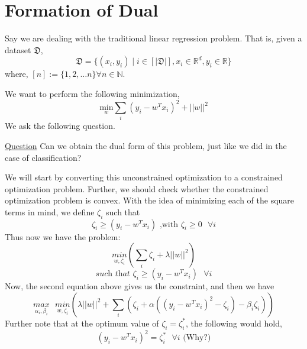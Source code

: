 \section{Formation of Dual}
Say we are dealing with the traditional linear regression problem. That is, given a dataset $\mathfrak{D}$,
\[\mathfrak{D} = \{(x_i,y_i) \mid i \in [|\mathfrak{D}|], x_i \in \mathbb{R}^d, y_i \in \mathbb{R}\}\]
where, $[n] := \{1,2, \dots n\} \forall n \in \mathbb{N}$.


We want to perform the following minimization,
\[\underset{{w}}{\text{min}}\sum_{i}(y_i - {w}^Tx_i)^2 + ||w||^2\]
We ask the following question.
\begin{center}
    \underline{Question} Can we obtain the dual form of this problem, just like we did in the case of classification?
\end{center}
We will start by converting this unconstrained optimization to a constrained optimization problem. Further, we should check whether the constrained optimization problem is convex.
With the idea of minimizing each of the square terms in mind, we define $\zeta_i$ such that
\[\zeta_i \geq (y_i - w^Tx_i) \text{ ,with } \zeta_i \geq 0 \text{ } \forall i\]
Thus now we have the problem:
\[\underset{w,\zeta_i}{min}(\sum_i\zeta_i + \lambda||w||^2)\]
\[\textit{such that } \zeta_i \geq (y_i - w^Tx_i) \text{ } \forall i\]
Now, the second equation above gives us the constraint, and then we have
\[\underset{\alpha_i,\beta_i}{max}\text{ }\underset{w,\zeta_i}{min}\left(\lambda||w||^2 + \sum_i(\zeta_i + \alpha((y_i - w^Tx_i)^2 - \zeta_i) - \beta_i\zeta_i)\right)\]
Further note that at the optimum value of $\zeta_i = \zeta_i^*$, the following would hold,
\[(y_i - w^Tx_i)^2 = \zeta_i^* \text{ } \forall i \text{   (Why?)}\]
